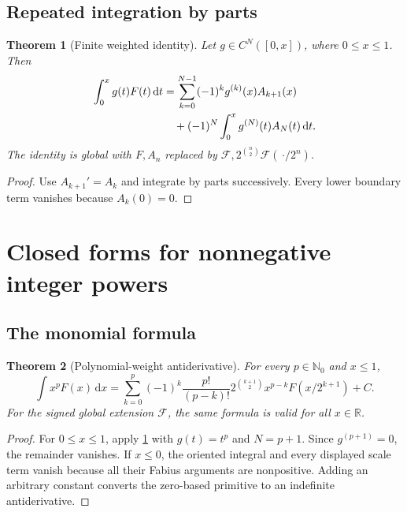 \documentclass[11pt,oneside]{article}
\numberwithin{equation}{section}
\newtheorem{theorem}{Theorem}[section]
\theoremstyle{definition}
\theoremstyle{remark}
\newcommand{\R}{\mathbb R}
\newcommand{\N}{\mathbb N}
\newcommand{\dd}{\,\mathrm d}
\begin{document}
\subsection{Repeated integration by parts}
\begin{theorem}[Finite weighted identity]
\label{thm:finite-weighted}
Let $g\in C^N([0,x])$, where $0\le x\le1$.  Then
\begin{align}
 \int_0^xg(t)F(t)\dd t
 &=\sum_{k=0}^{N-1}(-1)^kg^{(k)}(x)A_{k+1}(x)              \notag\\
 &\quad+(-1)^N\int_0^xg^{(N)}(t)A_N(t)\dd t.              \label{eq:finite-weighted}
\end{align}
The identity is global with $F,A_n$ replaced by $\mathcal F,
2^{\binom n2}\mathcal F(\,\boldsymbol{\cdot}/2^n)$.
\end{theorem}

\begin{proof}
Use $A_{k+1}'=A_k$ and integrate by parts successively.  Every lower boundary
term vanishes because $A_k(0)=0$.
\end{proof}

\section{Closed forms for nonnegative integer powers}
\label{sec:polynomial}

\subsection{The monomial formula}
\begin{theorem}[Polynomial-weight antiderivative]
\label{thm:monomial}
For every $p\in\N_0$ and $x\le1$,
\begin{equation}
 \boxed{
 \int x^pF(x)\dd x=
 \sum_{k=0}^{p}(-1)^k\frac{p!}{(p-k)!}
 2^{\binom{k+1}{2}}x^{p-k}F(x/2^{k+1})+C.}                \label{eq:monomial-closed}
\end{equation}
For the signed global extension $\mathcal F$, the same formula is valid for all
$x\in\R$.
\end{theorem}

\begin{proof}
For $0\le x\le1$, apply \cref{thm:finite-weighted} with $g(t)=t^p$ and
$N=p+1$.  Since $g^{(p+1)}=0$, the remainder vanishes.  If $x\le0$, the
oriented integral and every displayed scale term vanish because all their
Fabius arguments are nonpositive.  Adding an arbitrary constant converts the
zero-based primitive to an indefinite antiderivative.
\end{proof}
\end{document}
